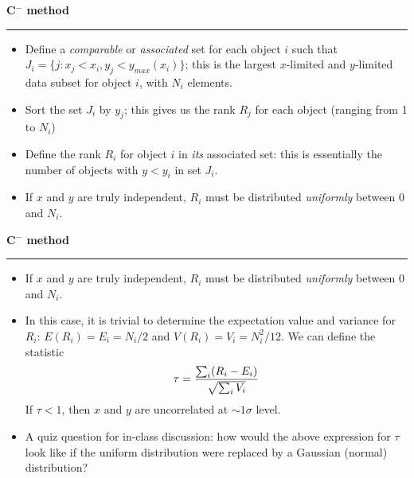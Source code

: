 \documentclass[letterpaper,landscape]{slides}
\begin{document}
\begin{slide}
\begin{center}
\bfseries
{\large {\color{red} C$^-$ method}}
\end{center}
\vskip 0.2in
\hrule

\begin{itemize}
\item 
Define a {\it comparable} or {\it associated} set for each object $i$ such that 
$J_i = \{ j:x_j < x_i, y_j < y_{max}(x_i)\}$; this is the largest $x$-limited and $y$-limited data 
subset for object $i$, with $N_i$ elements.
\item Sort the set $J_i$ by $y_j$; this gives us the rank $R_j$ for each object (ranging
from 1 to $N_i$)
\item Define the rank $R_i$ for object $i$ in {\it its} associated set: this is 
essentially the number of objects with $y<y_i$ in set $J_i$.
\item If $x$ and $y$ are truly independent, $R_i$ must be distributed 
      {\it uniformly} between 0 and $N_i$. 
\end{itemize}

\vskip -0.7in
\phantom{x}

\vfill
\end{slide}
 


\begin{slide}
\begin{center}
\bfseries
{\large {\color{red} C$^-$ method}}
\end{center}
\vskip 0.2in
\hrule

\begin{itemize}
\item If $x$ and $y$ are truly independent, $R_i$ must be distributed 
      {\it uniformly} between 0 and $N_i$.
\item In this case, it is trivial to determine 
      the expectation value and variance for $R_i$: $E(R_i) = E_i = N_i/2$
      and $V(R_i) = V_i = N_i^2/12$. We can define the statistic
\begin{equation}
      \tau = {\sum_i (R_i - E_i)\over \sqrt {\sum_i V_i   }   } 
\end{equation}
If $\tau < 1$, then $x$ and $y$ are uncorrelated at $\sim1 \sigma$ level.
\item A quiz question for in-class discussion: how would the above expression 
   for $\tau$ look like if the uniform distribution were replaced by a Gaussian 
   (normal) distribution? 
\end{itemize}

\vskip -0.7in
\phantom{x}

\vfill
\end{slide}
 
\end{document}

